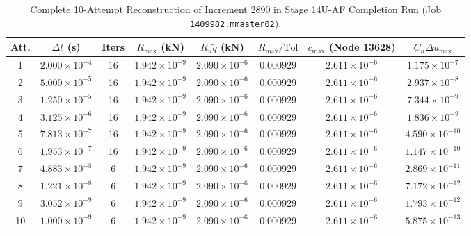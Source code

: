 \begin{table}[htbp]
\centering
\small
\caption{Complete 10-Attempt Reconstruction of Increment 2890 in Stage 14U-AF Completion Run (Job \texttt{1409982.mmaster02}).}
\label{tab:stage14uah_increment2890_reconstruction}
\begin{tabularx}{\textwidth}{c c c c c c c c}
\toprule
\textbf{Att.} & $\Delta t$ (s) & \textbf{Iters} & $R_{\max}$ (kN) & $R_n \tilde{q}$ (kN) & $R_{\max} / \text{Tol}$ & $c_{\max}$ (Node 13628) & $C_n \Delta u_{\max}$ \\
\midrule
1 & $2.000\times 10^{-4}$ & 16 & $1.942\times 10^{-9}$ & $2.090\times 10^{-6}$ & $\mathbf{0.000929}$ & $2.611\times 10^{-6}$ & $1.175\times 10^{-7}$ \\
2 & $5.000\times 10^{-5}$ & 16 & $1.942\times 10^{-9}$ & $2.090\times 10^{-6}$ & $\mathbf{0.000929}$ & $2.611\times 10^{-6}$ & $2.937\times 10^{-8}$ \\
3 & $1.250\times 10^{-5}$ & 16 & $1.942\times 10^{-9}$ & $2.090\times 10^{-6}$ & $\mathbf{0.000929}$ & $2.611\times 10^{-6}$ & $7.344\times 10^{-9}$ \\
4 & $3.125\times 10^{-6}$ & 16 & $1.942\times 10^{-9}$ & $2.090\times 10^{-6}$ & $\mathbf{0.000929}$ & $2.611\times 10^{-6}$ & $1.836\times 10^{-9}$ \\
5 & $7.813\times 10^{-7}$ & 16 & $1.942\times 10^{-9}$ & $2.090\times 10^{-6}$ & $\mathbf{0.000929}$ & $2.611\times 10^{-6}$ & $4.590\times 10^{-10}$ \\
6 & $1.953\times 10^{-7}$ & 16 & $1.942\times 10^{-9}$ & $2.090\times 10^{-6}$ & $\mathbf{0.000929}$ & $2.611\times 10^{-6}$ & $1.147\times 10^{-10}$ \\
7 & $4.883\times 10^{-8}$ & 6  & $1.942\times 10^{-9}$ & $2.090\times 10^{-6}$ & $\mathbf{0.000929}$ & $2.611\times 10^{-6}$ & $2.869\times 10^{-11}$ \\
8 & $1.221\times 10^{-8}$ & 6  & $1.942\times 10^{-9}$ & $2.090\times 10^{-6}$ & $\mathbf{0.000929}$ & $2.611\times 10^{-6}$ & $7.172\times 10^{-12}$ \\
9 & $3.052\times 10^{-9}$ & 6  & $1.942\times 10^{-9}$ & $2.090\times 10^{-6}$ & $\mathbf{0.000929}$ & $2.611\times 10^{-6}$ & $1.793\times 10^{-12}$ \\
10 & $1.000\times 10^{-9}$ & 6 & $1.942\times 10^{-9}$ & $2.090\times 10^{-6}$ & $\mathbf{0.000929}$ & $2.611\times 10^{-6}$ & $5.875\times 10^{-13}$ \\
\bottomrule
\end{tabularx}
\end{table}

